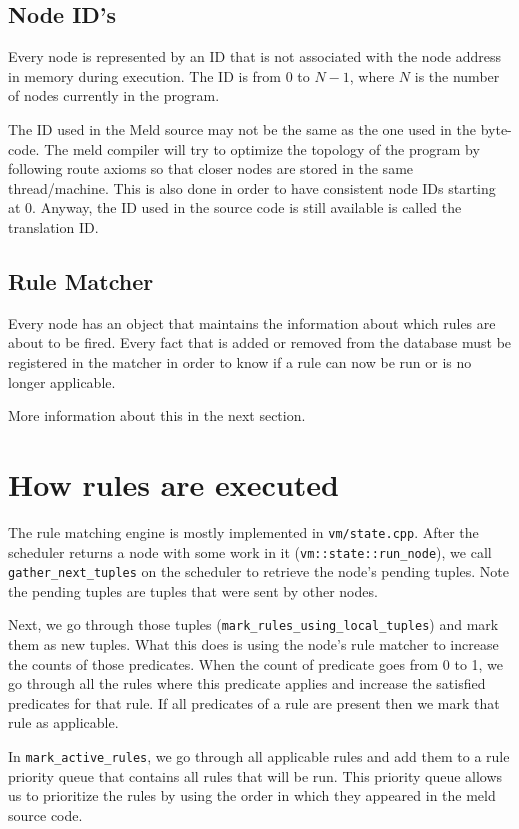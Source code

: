 \documentclass[11pt]{article}
\begin{document}
\subsection{Node ID's}

Every node is represented by an ID that is not associated with the node address in memory during execution. The ID is from 0 to $N-1$, where $N$ is the number of nodes currently in the program.

The ID used in the Meld source may not be the same as the one used in the byte-code. The meld compiler will try to optimize the topology of the program by following route axioms so that closer nodes are stored in the same thread/machine. This is also done in order to have consistent node IDs starting at 0. Anyway, the ID used in the source code is still available is called the translation ID.

\subsection{Rule Matcher}

Every node has an object that maintains the information about which rules are about to be fired. Every fact that is added or removed from the database must be registered in the matcher in order to know if a rule can now be run or is no longer applicable.

More information about this in the next section.

\section{How rules are executed}

The rule matching engine is mostly implemented in \texttt{vm/state.cpp}. After the scheduler returns a node with some work in it (\texttt{vm::state::run\_node}), we call \texttt{gather\_next\_tuples} on the scheduler to retrieve the node's pending tuples. Note the pending tuples are tuples that were sent by other nodes.

Next, we go through those tuples (\texttt{mark\_rules\_using\_local\_tuples}) and mark them as new tuples. What this does is using the node's rule matcher to increase the counts of those predicates. When the count of predicate goes from 0 to 1, we go through all the rules where this predicate applies and increase the satisfied predicates for that rule. If all predicates of a rule are present then we mark that rule as applicable.

In \texttt{mark\_active\_rules}, we go through all applicable rules and add them to a rule priority queue that contains all rules that will be run. This priority queue allows us to prioritize the rules by using the order in which they appeared in the meld source code.
\end{document}
